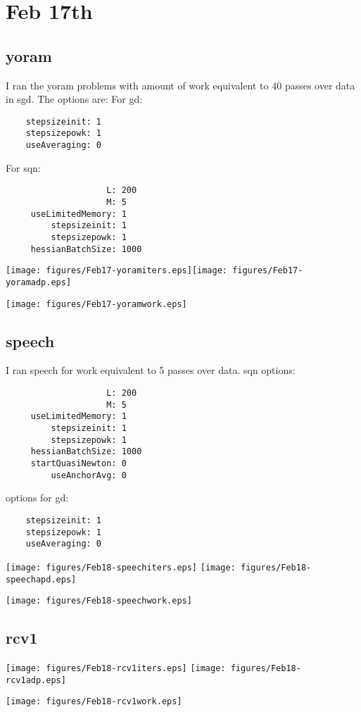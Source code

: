 \documentclass{article}
\begin{document}
\newpage

\section{Feb 17th}
\subsection{yoram}
I ran the yoram problems with amount of work equivalent to 40 passes over data in sgd. The options are:
For gd:
\begin{verbatim}
    stepsizeinit: 1
    stepsizepowk: 1
    useAveraging: 0
\end{verbatim}
For sqn:
\begin{verbatim}
                    L: 200
                    M: 5
     useLimitedMemory: 1
         stepsizeinit: 1
         stepsizepowk: 1
     hessianBatchSize: 1000
\end{verbatim}
\newpage

\texttt{[image: figures/Feb17-yoramiters.eps]}\texttt{[image: figures/Feb17-yoramadp.eps]} 

\texttt{[image: figures/Feb17-yoramwork.eps]} 

\subsection{speech}
I ran speech for work equivalent to 5 passes over data.
sqn options:
\begin{verbatim}
                    L: 200
                    M: 5
     useLimitedMemory: 1
         stepsizeinit: 1
         stepsizepowk: 1
     hessianBatchSize: 1000
     startQuasiNewton: 0
         useAnchorAvg: 0
\end{verbatim}
options for gd:
\begin{verbatim}
    stepsizeinit: 1
    stepsizepowk: 1
    useAveraging: 0
\end{verbatim}
\newpage

\texttt{[image: figures/Feb18-speechiters.eps]} 
\texttt{[image: figures/Feb18-speechapd.eps]} 


\texttt{[image: figures/Feb18-speechwork.eps]} 

\subsection{rcv1}
\newpage

\texttt{[image: figures/Feb18-rcv1iters.eps]} 
\texttt{[image: figures/Feb18-rcv1adp.eps]} 


\texttt{[image: figures/Feb18-rcv1work.eps]} 
\end{document}
